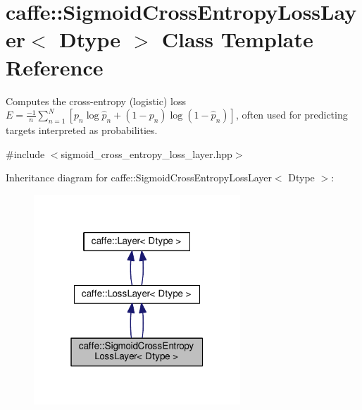 \hypertarget{classcaffe_1_1_sigmoid_cross_entropy_loss_layer}{}\section{caffe\+:\+:Sigmoid\+Cross\+Entropy\+Loss\+Layer$<$ Dtype $>$ Class Template Reference}
\label{classcaffe_1_1_sigmoid_cross_entropy_loss_layer}


Computes the cross-\/entropy (logistic) loss $ E = \frac{-1}{n} \sum\limits_{n=1}^N \left[ p_n \log \hat{p}_n + (1 - p_n) \log(1 - \hat{p}_n) \right] $, often used for predicting targets interpreted as probabilities.  




{\ttfamily \#include $<$sigmoid\+\_\+cross\+\_\+entropy\+\_\+loss\+\_\+layer.\+hpp$>$}



Inheritance diagram for caffe\+:\+:Sigmoid\+Cross\+Entropy\+Loss\+Layer$<$ Dtype $>$\+:
\nopagebreak
\begin{figure}[H]
\begin{center}
\leavevmode
\includegraphics[width=220pt]{classcaffe_1_1_sigmoid_cross_entropy_loss_layer__inherit__graph}
\end{center}
\end{figure}
